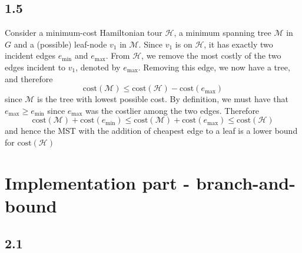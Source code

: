 \documentclass[12pt]{article}
\begin{document}
\subsection*{1.5} 
Consider a minimum-cost Hamiltonian tour $\mathcal{H}$, a minimum spanning tree $\mathcal{M}$ in $G$ and a (possible) leaf-node $v_1$ in $\mathcal{M}$. Since $v_1$ is on $\mathcal{H}$, it has exactly two incident edges $e_\text{min}$ and $e_{\text{max}}$. From $\mathcal{H}$, we remove the most costly of the two edges incident to $v_1$, denoted by $e_{\max}$. Removing this edge, we now have a tree, and therefore
$$
\text{cost}(\mathcal{M}) \leq \text{cost}(\mathcal{H}) - \text{cost}(e_{\max})
$$
since $\mathcal{M}$ is the tree with lowest possible cost. By definition, we must have that $e_{\max} \geq e_\text{min}$ since $e_\text{max}$ was the costlier among the two edges. Therefore
$$
\text{cost}(\mathcal{M}) + \text{cost}(e_\text{min}) \leq \text{cost}(\mathcal{M}) + \text{cost}(e_\text{max}) \leq \text{cost}(\mathcal{H})
$$
and hence the MST with the addition of cheapest edge to a leaf is a lower bound for $\text{cost}(\mathcal{H})$

\pagebreak
\section*{Implementation part - branch-and-bound}
\subsection*{2.1}
\end{document}
